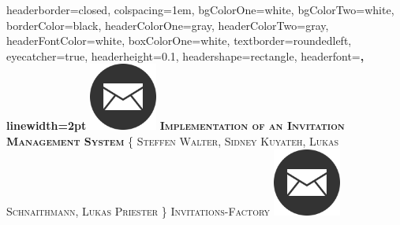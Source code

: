 \documentclass[landscape,a0paper,fontscale=0.35]{baposter} %
\begin{document}
\begin{poster}
{
headerborder=closed, %
colspacing=1em, %
bgColorOne=white, %
bgColorTwo=white, %
borderColor=black, %
headerColorOne=gray, %
headerColorTwo=gray, %
headerFontColor=white, %
boxColorOne=white, %
textborder=roundedleft, %
eyecatcher=true, %
headerheight=0.1\textheight, %
headershape=rectangle, %
headerfont=\Large\bf\textsc, %
linewidth=2pt %
}
%
{\includegraphics[height=6em]{favicon.png}} %
{\fontsize{32}{32} \textbf{\textsc{Implementation of an Invitation Management System}}\vspace{0.5em}} %
{\textsc{\{ Steffen Walter, Sidney Kuyateh, Lukas Schnaithmann, Lukas Priester \} \hspace{12pt} Invitations-Factory}} %
{\includegraphics[height=6em]{favicon.png}} %


\end{poster}
\end{document}
